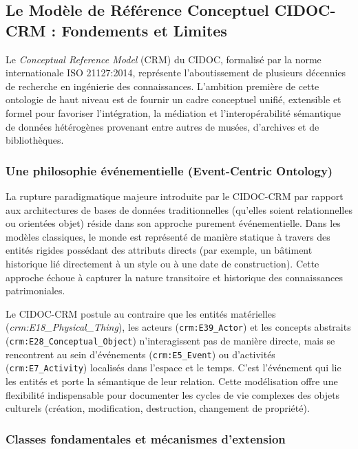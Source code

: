 \documentclass{article}
\begin{document}
\subsection{Le Modèle de Référence Conceptuel CIDOC-CRM : Fondements et Limites}
\label{subsec:cidoc_crm_approfondi}

Le \textit{Conceptual Reference Model} (CRM) du CIDOC, formalisé par la norme internationale ISO 21127:2014, représente l'aboutissement de plusieurs décennies de recherche en ingénierie des connaissances. L'ambition première de cette ontologie de haut niveau est de fournir un cadre conceptuel unifié, extensible et formel pour favoriser l'intégration, la médiation et l'interopérabilité sémantique de données hétérogènes provenant entre autres de musées, d'archives et de bibliothèques. 

\subsubsection{Une philosophie événementielle (Event-Centric Ontology)}

La rupture paradigmatique majeure introduite par le CIDOC-CRM par rapport aux architectures de bases de données traditionnelles (qu'elles soient relationnelles ou orientées objet) réside dans son approche purement événementielle. Dans les modèles classiques, le monde est représenté de manière statique à travers des entités rigides possédant des attributs directs (par exemple, un bâtiment historique lié directement à un style ou à une date de construction). Cette approche échoue à capturer la nature transitoire et historique des connaissances patrimoniales.

Le CIDOC-CRM postule au contraire que les entités matérielles (\textit{crm:E18\_Physical\_Thing}), les acteurs (\texttt{crm:E39\_Actor}) et les concepts abstraits (\texttt{crm:E28\_Conceptual\_Object}) n'interagissent pas de manière directe, mais se rencontrent au sein d'événements (\texttt{crm:E5\_Event}) ou d'activités (\texttt{crm:E7\_Activity}) localisés dans l'espace et le temps. C'est l'événement qui lie les entités et porte la sémantique de leur relation. Cette modélisation offre une flexibilité indispensable pour documenter les cycles de vie complexes des objets culturels (création, modification, destruction, changement de propriété).

\subsubsection{Classes fondamentales et mécanismes d'extension}
\end{document}

